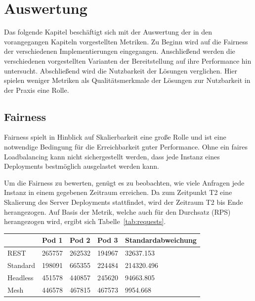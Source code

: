 \newpage


\section{Auswertung}\label{sec:auswertung}

Das folgende Kapitel beschäftigt sich mit der Auswertung der in den vorangegangen Kapiteln vorgestellten Metriken.
Zu Beginn wird auf die Fairness der verschiedenen Implementierungen eingegangen.
Anschließend werden die verschiedenen vorgestellten Varianten der Bereitstellung auf ihre Performance hin untersucht.
Abschließend wird die Nutzbarkeit der Lösungen verglichen.
Hier spielen weniger Metriken als Qualitätsmerkmale der Lösungen zur Nutzbarkeit in der Praxis eine Rolle.

\subsection{Fairness}\label{subsec:fairness}

Fairness spielt in Hinblick auf Skalierbarkeit eine große Rolle und ist eine notwendige Bedingung für die Erreichbarkeit guter Performance.
Ohne ein faires Loadbalancing kann nicht sichergestellt werden, dass jede Instanz eines Deployments bestmöglich ausgelastet werden kann.

Um die Fairness zu bewerten, genügt es zu beobachten, wie viele Anfragen jede Instanz in einem gegebenen Zeitraum erreichen.
Da zum Zeitpunkt T2 eine Skalierung des Server Deployments stattfindet, wird der Zeitraum T2 bis Ende herangezogen.
Auf Basis der Metrik, welche auch für den Durchsatz (RPS) herangezogen wird, ergibt sich Tabelle~\ref{tab:requests}.

\begin{table}[H]
    \centering
    \begin{tabular}{|l|l|l|l|l|}
        \hline
        & Pod 1  & Pod 2  & Pod 3  & Standardabweichung \\ \hline
        REST     & 265757 & 262532 & 194967 & 32637.153          \\ \hline
        Standard & 198091 & 665355 & 224484 & 214320.496         \\ \hline
        Headless & 451578 & 440857 & 245620 & 94663.805          \\ \hline
        Mesh     & 446578 & 467815 & 467573 & 9954.668           \\ \hline
    \end{tabular}
\end{table}\label{tab:requests}

